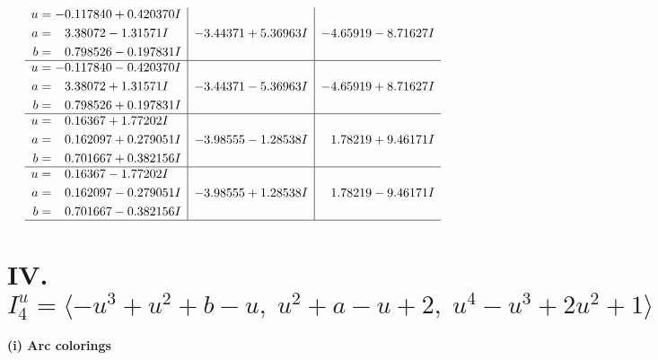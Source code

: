 \documentclass[1p]{elsarticle_modified}
\theoremstyle{definition}
\begin{document}
$$\begin{array}{c|c|c}
\begin{aligned}
u &= -0.117840 + 0.420370 I \\
a &= \phantom{-}3.38072 - 1.31571 I \\
b &= \phantom{-}0.798526 - 0.197831 I\end{aligned}
 & -3.44371 + 5.36963 I & -4.65919 - 8.71627 I \\ \hline\begin{aligned}
u &= -0.117840 - 0.420370 I \\
a &= \phantom{-}3.38072 + 1.31571 I \\
b &= \phantom{-}0.798526 + 0.197831 I\end{aligned}
 & -3.44371 - 5.36963 I & -4.65919 + 8.71627 I \\ \hline\begin{aligned}
u &= \phantom{-}0.16367 + 1.77202 I \\
a &= \phantom{-}0.162097 + 0.279051 I \\
b &= \phantom{-}0.701667 + 0.382156 I\end{aligned}
 & -3.98555 - 1.28538 I & \phantom{-}1.78219 + 9.46171 I \\ \hline\begin{aligned}
u &= \phantom{-}0.16367 - 1.77202 I \\
a &= \phantom{-}0.162097 - 0.279051 I \\
b &= \phantom{-}0.701667 - 0.382156 I\end{aligned}
 & -3.98555 + 1.28538 I & \phantom{-}1.78219 - 9.46171 I\\
 \hline 
 \end{array}$$\newpage\newpage\renewcommand{\arraystretch}{1}
\centering \section*{IV. $I^u_{4}= \langle - u^3+u^2+b- u,\;u^2+a- u+2,\;u^4- u^3+2 u^2+1 \rangle$}
\flushleft \textbf{(i) Arc colorings}\\
\end{document}
